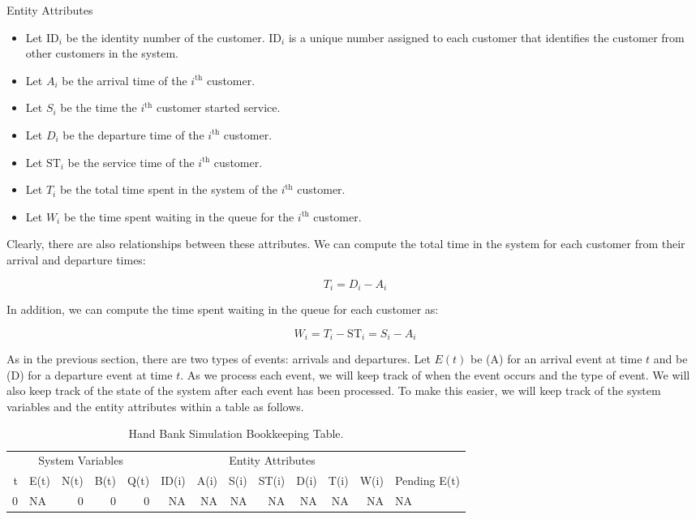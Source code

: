 \documentclass[
]{book}
\theoremstyle{definition}
\theoremstyle{definition}
\theoremstyle{definition}
\theoremstyle{definition}
\theoremstyle{remark}
\begin{document}
Entity Attributes

\begin{itemize}
\item
  Let \(\mathrm{ID}_{i}\) be the identity number of the customer.
  \(\mathrm{ID}_{i}\) is a unique number assigned to each customer that
  identifies the customer from other customers in the system.
\item
  Let \(A_{i}\) be the arrival time of the \(i^{\mathrm{th}}\) customer.
\item
  Let \(S_{i}\) be the time the \(i^{\mathrm{th}}\) customer started
  service.
\item
  Let \(D_{i}\) be the departure time of the \(i^{\mathrm{th}}\) customer.
\item
  Let \(\mathrm{ST}_{i}\) be the service time of the \(i^{\mathrm{th}}\)
  customer.
\item
  Let \(T_{i}\) be the total time spent in the system of the
  \(i^{\mathrm{th}}\) customer.
\item
  Let \(W_{i}\) be the time spent waiting in the queue for the
  \(i^{\mathrm{th}}\) customer.
\end{itemize}

Clearly, there are also relationships between these attributes. We can
compute the total time in the system for each customer from their
arrival and departure times:

\[T_{i} = D_{i} - A_{i}\]

In addition, we can compute the time spent waiting in the queue for each
customer as:

\[W_{i} = T_{i} - \mathrm{ST}_{i} = S_{i} - A_{i}\]

As in the previous section, there are two types of events: arrivals and
departures. Let \(E(t)\) be (A) for an arrival event at time \(t\) and be
(D) for a departure event at time \(t\). As we process each event, we will
keep track of when the event occurs and the type of event. We will also
keep track of the state of the system after each event has been
processed. To make this easier, we will keep track of the system
variables and the entity attributes within a table as follows.

\begin{table}

\caption{\label{tab:SQBH1}Hand Bank Simulation Bookkeeping Table.}
\centering
\fontsize{10}{12}\selectfont
\begin{tabular}[t]{rlrrrrrrrrrrl}
\toprule
\multicolumn{5}{c}{System Variables} & \multicolumn{7}{c}{Entity Attributes} & \multicolumn{1}{c}{ } \\
\cmidrule(l{3pt}r{3pt}){1-5} \cmidrule(l{3pt}r{3pt}){6-12}
t & E(t) & N(t) & B(t) & Q(t) & ID(i) & A(i) & S(i) & ST(i) & D(i) & T(i) & W(i) & Pending E(t)\\
\midrule
0 & NA & 0 & 0 & 0 & NA & NA & NA & NA & NA & NA & NA & NA\\
\bottomrule
\end{tabular}
\end{table}
\end{document}
